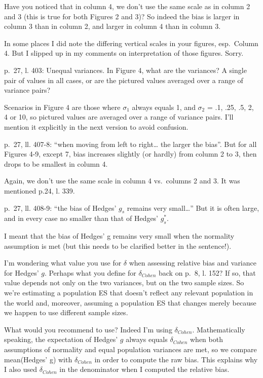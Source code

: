 \documentclass[
  12pt,
  french,
]{article}
\begin{document}
\color{blue} Have you noticed that in column 4, we don't use the same
scale as in column 2 and 3 (this is true for both Figures 2 and 3)? So
indeed the bias is larger in column 3 than in column 2, and larger in
column 4 than in column 3.

\color{brown} In some places I did note the differing vertical scales in
your figures, esp.~Column 4. But I slipped up in my comments on
interpretation of those figures. Sorry.

\color{black} p.~27, l. 403: Unequal variances. In Figure 4, what are
the variances? A single pair of values in all cases, or are the pictured
values averaged over a range of variance pairs?

\color{blue} Scenarios in Figure 4 are those where \(\sigma_1\) always
equals 1, and \(\sigma_2\) = .1, .25, .5, 2, 4 or 10, so pictured values
are averaged over a range of variance pairs. I'll mention it explicitly
in the next version to avoid confusion.

\color{black} p.~27, ll. 407-8: ``when moving from left to right\ldots{}
the larger the bias''. But for all Figures 4-9, except 7, bias increases
slightly (or hardly) from column 2 to 3, then drops to be smallest in
column 4.

\color{blue} Again, we don't use the same scale in column 4 vs.~columns
2 and 3. It was mentioned p.24, l. 339.

\color{black} p.~27, ll. 408-9: ``the bias of Hedges' \(g_s\) remains
very small\ldots{}'' But it is often large, and in every case no smaller
than that of Hedges' \(g_s^*\).

\color{blue} I meant that the bias of Hedges' g remains very small when
the normality assumption is met (but this needs to be clarified better
in the sentence!).

\color{black} I'm wondering what value you use for \(\delta\) when
assessing relative bias and variance for Hedges' \(g\). Perhaps what you
define for \(\delta_{Cohen}\) back on p.~8, l. 152? If so, that value
depends not only on the two variances, but on the two sample sizes. So
we're estimating a population ES that doesn't reflect any relevant
population in the world and, moreover, assuming a population ES that
changes merely because we happen to use different sample sizes.

\color{blue} What would you recommend to use? Indeed I'm using
\(\delta_{Cohen}\). Mathematically speaking, the expectation of Hedges'
\(g\) always equals \(\delta_{Cohen}\) when both assumptions of
normality and equal population variances are met, so we compare
mean(Hedges' g) with \(\delta_{Cohen}\) in order to compute the raw
bias. This explains why I also used \(\delta_{Cohen}\) in the
denominator when I computed the relative bias.
\end{document}
